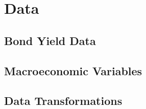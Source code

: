 \chapter{Data}

\section{Bond Yield Data}

\section{Macroeconomic Variables}

\section{Data Transformations}
